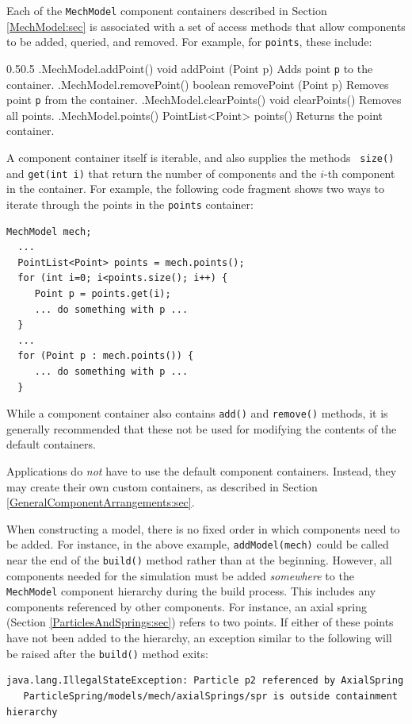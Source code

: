 Each of the {\tt MechModel} component containers described in
Section \ref{MechModel:sec} is associated with a set of access methods that
allow components to be added, queried, and removed. For example, for
{\tt points}, these include:
%
\begin{methodtable}{0.5}{0.5}
\midline
%
\methodentry
{\mech.MechModel.addPoint()}%
{void addPoint (Point p)}%
{Adds point {\tt p} to the container.}%
%
\methodentry
{\mech.MechModel.removePoint()}%
{boolean removePoint (Point p)}%
{Removes point {\tt p} from the container.}%
%
\methodentry
{\mech.MechModel.clearPoints()}%
{void clearPoints()}%
{Removes all points.}%
%
\methodentry
{\mech.MechModel.points()}%
{PointList<Point> points()}%
{Returns the point container.}%
%
\midline
\end{methodtable}
%
A component container itself is iterable, and also supplies the methods {\tt
size()} and {\tt get(int i)} that return the number of components and the
$i$-th component in the container. For example, the following code fragment
shows two ways to iterate through the points in the {\tt points} container:
%
\begin{lstlisting}[]
  MechModel mech;
  ...
  PointList<Point> points = mech.points();
  for (int i=0; i<points.size(); i++) {
     Point p = points.get(i);
     ... do something with p ...
  }
  ...
  for (Point p : mech.points()) {
     ... do something with p ...
  }
\end{lstlisting}
%
\begin{sideblock}
While a component container also contains {\tt add()} and {\tt remove()}
methods, it is generally recommended that these not be used for modifying the
contents of the default containers.
\end{sideblock}

\begin{sideblock}
Applications do {\it not} have to use the default component containers.
Instead, they may create their own custom containers, as described in
Section \ref{GeneralComponentArrangements:sec}.
\end{sideblock}

When constructing a model, there is no fixed order in which components need to
be added. For instance, in the above example, {\tt addModel(mech)} could be
called near the end of the {\tt build()} method rather than at the
beginning. However, all components needed for the simulation must be added {\it
somewhere} to the {\tt MechModel} component hierarchy during the build process.
This includes any components referenced by other components. For instance,
an axial spring (Section \ref{ParticlesAndSprings:sec}) refers to two
points. If either of these points have not been added to the hierarchy,
an exception similar to the following will be raised after the {\tt build()}
method exits:
%
\begin{lstlisting}[]
java.lang.IllegalStateException: Particle p2 referenced by AxialSpring 
   ParticleSpring/models/mech/axialSprings/spr is outside containment hierarchy
\end{lstlisting}
%

